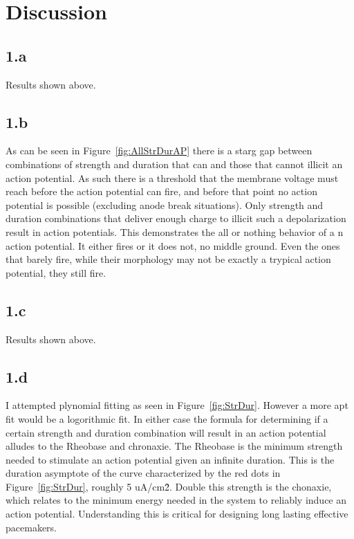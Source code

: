 \documentclass[12pt]{article}
\begin{document}
\section{Discussion}
\subsection{1.a}
\par{}
Results shown above.
\subsection{1.b}
\par{}
As can be seen in Figure~\ref{fig:AllStrDurAP} there is a starg gap between combinations of strength and duration that can and those that cannot illicit an action potential. As such there is a threshold that the membrane voltage must reach before the action potential can fire, and before that point no action potential is possible (excluding anode break situations). Only strength and duration combinations that deliver enough charge to illicit such a depolarization result in action potentials. This demonstrates the all or nothing behavior of a n action potential. It either fires or it does not, no middle ground. Even the ones that barely fire, while their morphology may not be exactly a trypical action potential, they still fire.

\subsection{1.c}
\par{}
Results shown above.

\subsection{1.d}
\par{}
I attempted plynomial fitting as seen in Figure~\ref{fig:StrDur}. However a more apt fit would be a logorithmic fit. In either case the formula for determining if a certain strength and duration combination will result in an action potential alludes to the Rheobase and chronaxie. The Rheobase is the minimum strength needed to stimulate an action potential given an infinite duration. This is the duration asymptote of the curve characterized by the red dots in Figure~\ref{fig:StrDur}, roughly 5 uA/cm\^2. Double this strength is the chonaxie, which relates to the minimum energy needed in the system to reliably induce an action potential. Understanding this is critical for designing long lasting effective pacemakers.
\end{document}

